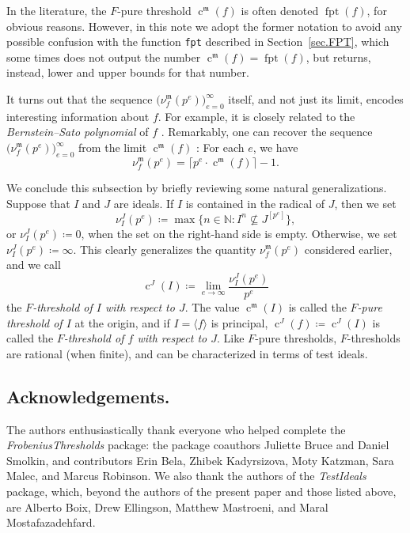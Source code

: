 \documentclass{amsart}
\newcommand{\ft}{\operatorname{c}}
\newcommand{\idealm}{\mathfrak{m}}
\DeclareMathOperator{\fpt}{fpt}
\begin{document}
In the literature, the $F$-pure threshold $\ft^{\idealm}(f)$ is often denoted $\fpt(f)$, for obvious reasons.
However, in this note we adopt the former notation to avoid any possible confusion with the function \texttt{fpt} described in Section~\ref{sec.FPT}, which some times does not output the number $\ft^{\idealm}(f) = \fpt(f)$, but returns, instead, lower and upper bounds for that number.

It turns out that the sequence $\big(\nu_f^{\idealm}(p^e) \big)_{e=0}^{\infty}$ itself, and not just its limit, encodes interesting information about $f$.  For example, it is closely related to the \emph{Bernstein--Sato polynomial} of $f$ \cite{MustataTakagiWatanabeFThresholdsAndBernsteinSato}.  
Remarkably, 
one can recover the sequence $\big( \nu_f^{\idealm}(p^e) \big)_{e=0}^{\infty}$ from the limit $\ft^{\idealm}(f)$ \cite{MustataTakagiWatanabeFThresholdsAndBernsteinSato, HernandezFPurityOfHypersurfaces}: For each $e$, we have
\begin{equation*}
\nu_f^{\idealm}(p^e) = \lceil p^e \cdot \ft^{\idealm}(f) \rceil - 1.
\end{equation*}

We conclude this subsection by briefly reviewing some natural generalizations.
Suppose that $I$ and $J$ are ideals.
If $I$ is contained in the radical of $J$, then we set
%
\[ \nu_I^J(p^e) \coloneqq \max \{ n \in \mathbb{N}: I^n \not\subseteq J^{[p^e]} \}, \]
or $\nu_I^J(p^e) \coloneqq 0$, when the set on the right-hand side is empty.
Otherwise, we set $\nu_I^J(p^e) \coloneqq \infty$.
This clearly generalizes the quantity $\nu_f^{\idealm}(p^e)$ considered earlier, and we call
\[ \ft^J(I) \coloneqq  \lim_{e \to \infty} \frac{ \nu_I^J(p^e)}{p^e} \]
the \emph{$F$-threshold of $I$ with respect to $J$}. 
The value $\ft^{\idealm}(I)$ is called the \emph{$F$-pure threshold of $I$} at the origin, and if $I = \langle f \rangle$ is principal,  $\ft^{J}(f) \coloneqq  \ft^J(I)$ is called the \emph{$F$-threshold of $f$ with respect to $J$}.
Like $F$-pure thresholds, $F$-thresholds are rational (when finite), and can be characterized in terms of test ideals.

\subsection*{Acknowledgements.}  The authors enthusiastically thank everyone who helped complete the \emph{FrobeniusThresholds} package: the package coauthors Juliette Bruce and Daniel Smolkin, and contributors  Erin Bela, Zhibek Kadyrsizova, Moty Katzman, Sara Malec, and Marcus Robinson.  We also thank the authors of the \emph{TestIdeals} package, which, beyond the authors of the present paper and those listed above, are Alberto Boix, Drew Ellingson, Matthew Mastroeni, and Maral Mostafazadehfard.
\end{document}

